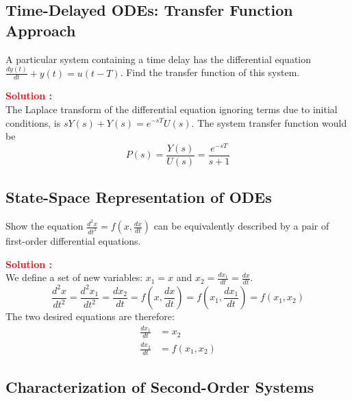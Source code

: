 \documentclass[12pt]{article}
\begin{document}
\clearpage
\subsection{Time-Delayed ODEs: Transfer Function Approach}

A particular system containing a time delay has the differential equation \(\frac{dy(t)}{dt} + y(t) = u(t-T)\). Find the transfer function of this system.

\textbf{\textcolor{red}{Solution :}} \\
The Laplace transform of the differential equation ignoring terms due to initial conditions, is \(sY(s) + Y(s) = e^{-sT}U(s)\). The system transfer function would be 
\begin{equation}
    P(s) = \frac{Y(s)}{U(s)} = \frac{e^{-sT}}{s+1}
\end{equation}

\clearpage
\subsection{State-Space Representation of ODEs}

Show the equation \(\frac{d^2x}{dt^2} = f(x, \frac{dx}{dt})\) can be equivalently described by a pair of first-order differential equations.

\textbf{\textcolor{red}{Solution :}} \\
We define a set of new variables: \(x_1 = x\) and \(x_2 = \frac{dx_1}{dt} = \frac{dx}{dt}\).
\begin{equation}
    \frac{d^2x}{dt^2} = \frac{d^2x_1}{dt^2} = \frac{dx_2}{dt} = f(x, \frac{dx}{dt}) = f(x_1, \frac{dx_1}{dt}) = f(x_1,x_2)
\end{equation}
The two desired equations are therefore:
\begin{align*}
\frac{dx_1}{dt} &= x_2 \\
\frac{dx_2}{dt} &= f(x_1, x_2)
\end{align*}

\clearpage
\subsection{Characterization of Second-Order Systems}
\end{document}
